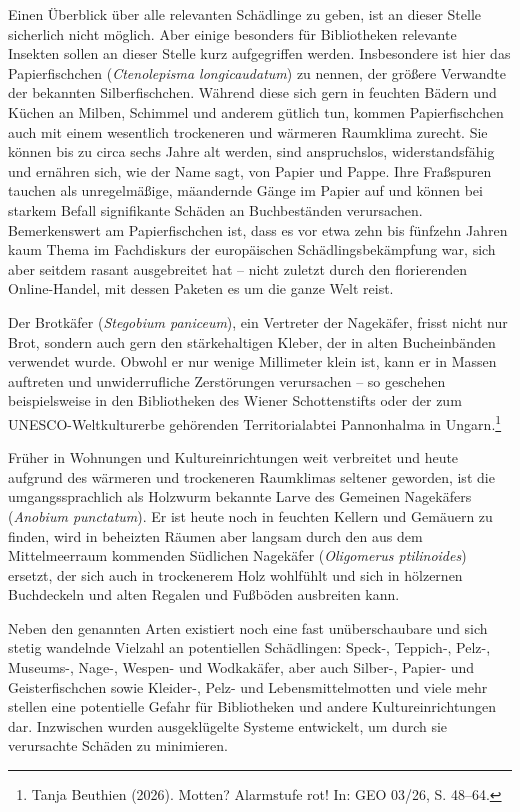 \documentclass[a4paper,
fontsize=11pt,
oneside,
numbers=noperiodatend,
parskip=half-,
bibliography=totoc,
final
]{scrartcl}
\begin{document}
Einen Überblick über alle relevanten Schädlinge zu geben, ist an dieser
Stelle sicherlich nicht möglich. Aber einige besonders für Bibliotheken
relevante Insekten sollen an dieser Stelle kurz aufgegriffen werden.
Insbesondere ist hier das Papierfischchen (\emph{Ctenolepisma
longicaudatum}) zu nennen, der größere Verwandte der bekannten
Silberfischchen. Während diese sich gern in feuchten Bädern und Küchen
an Milben, Schimmel und anderem gütlich tun, kommen Papierfischchen auch
mit einem wesentlich trockeneren und wärmeren Raumklima zurecht. Sie
können bis zu circa sechs Jahre alt werden, sind anspruchslos,
widerstandsfähig und ernähren sich, wie der Name sagt, von Papier und
Pappe. Ihre Fraßspuren tauchen als unregelmäßige, mäandernde Gänge im
Papier auf und können bei starkem Befall signifikante Schäden an
Buchbeständen verursachen. Bemerkenswert am Papierfischchen ist, dass es
vor etwa zehn bis fünfzehn Jahren kaum Thema im Fachdiskurs der
europäischen Schädlingsbekämpfung war, sich aber seitdem rasant
ausgebreitet hat -- nicht zuletzt durch den florierenden Online-Handel,
mit dessen Paketen es um die ganze Welt reist.

Der Brotkäfer (\emph{Stegobium paniceum}), ein Vertreter der Nagekäfer,
frisst nicht nur Brot, sondern auch gern den stärkehaltigen Kleber, der
in alten Bucheinbänden verwendet wurde. Obwohl er nur wenige Millimeter
klein ist, kann er in Massen auftreten und unwiderrufliche Zerstörungen
verursachen -- so geschehen beispielsweise in den Bibliotheken des
Wiener Schottenstifts oder der zum UNESCO-Weltkulturerbe gehörenden
Territorialabtei Pannonhalma in Ungarn.\footnote{Tanja Beuthien (2026).
  Motten? Alarmstufe rot! In: GEO 03/26, S. 48--64.}

Früher in Wohnungen und Kultureinrichtungen weit verbreitet und heute
aufgrund des wärmeren und trockeneren Raumklimas seltener geworden, ist
die umgangssprachlich als Holzwurm bekannte Larve des Gemeinen
Nagekäfers (\emph{Anobium punctatum}). Er ist heute noch in feuchten
Kellern und Gemäuern zu finden, wird in beheizten Räumen aber langsam
durch den aus dem Mittelmeerraum kommenden Südlichen Nagekäfer
(\emph{Oligomerus ptilinoides}) ersetzt, der sich auch in trockenerem
Holz wohlfühlt und sich in hölzernen Buchdeckeln und alten Regalen und
Fußböden ausbreiten kann.

Neben den genannten Arten existiert noch eine fast unüberschaubare und
sich stetig wandelnde Vielzahl an potentiellen Schädlingen: Speck-,
Teppich-, Pelz-, Museums-, Nage-, Wespen- und Wodkakäfer, aber auch
Silber-, Papier- und Geisterfischchen sowie Kleider-, Pelz- und
Lebensmittelmotten und viele mehr stellen eine potentielle Gefahr für
Bibliotheken und andere Kultureinrichtungen dar. Inzwischen wurden
ausgeklügelte Systeme entwickelt, um durch sie verursachte Schäden zu
minimieren.
\end{document}
